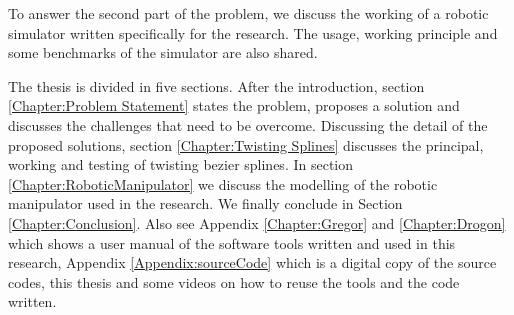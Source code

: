 {    To answer the second part of the problem, we discuss the working of a robotic simulator written specifically for the research. The usage, working principle and some benchmarks of the simulator are also shared.

    The thesis is divided in five sections. After the introduction, section \ref{Chapter:Problem Statement} states the problem, proposes a solution and discusses the challenges that need to be overcome. Discussing the detail of the proposed solutions, section \ref{Chapter:Twisting Splines} discusses the principal, working and testing of twisting bezier splines. In section \ref{Chapter:RoboticManipulator} we discuss the modelling of the robotic manipulator used in the research. %
    We finally conclude in Section \ref{Chapter:Conclusion}. Also see Appendix \ref{Chapter:Gregor} and \ref{Chapter:Drogon} which shows a user manual of the software tools written and used in this research, Appendix \ref{Appendix:sourceCode} which is a digital copy of the source codes, this thesis and some videos on how to reuse the tools and the code written.
} 